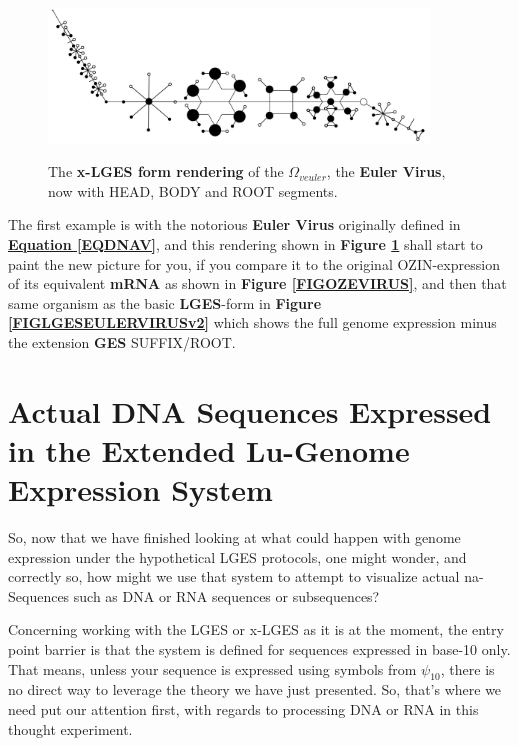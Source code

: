 \documentclass[a4paper, 18pt]{book} %
\begin{document}
\begin{figure}[H]
  \begin{center}
   \includegraphics[trim=0cm 0cm 0cm 0cm, clip, width=0.9\textwidth,]{resources/pdfs/EXT-v2-PLATONIC-EULERVIRUS-landscape.pdf}\\
   \caption{The \textbf{x-LGES form rendering} of the $\Omega_{veuler}$, the \textbf{Euler Virus}, now with HEAD, BODY and ROOT segments.}
  \label{FIGLGESEULERVIRUSv2EXT}
  \end{center}
\end{figure}

The first example is with the notorious \textbf{Euler Virus} originally defined in \textbf{\hyperref[EQDNAV]{Equation \ref{EQDNAV}}}, and this rendering shown in \textbf{Figure \ref{FIGLGESEULERVIRUSv2EXT}} shall start to paint the new picture for you, if you compare it to the original OZIN-expression of its equivalent \textbf{mRNA} as shown in \textbf{Figure \ref{FIGOZEVIRUS}}, and then that same organism as the basic \textbf{LGES}-form in \textbf{Figure \ref{FIGLGESEULERVIRUSv2}} which shows the full genome expression minus the extension \textbf{GES} SUFFIX/ROOT.


\section{Actual DNA Sequences Expressed in the Extended Lu-Genome Expression System}

So, now that we have finished looking at what could happen with genome expression under the hypothetical LGES protocols, one might wonder, and correctly so, how might we use that system to attempt to visualize actual na-Sequences such as DNA or RNA sequences or subsequences?

Concerning working with the LGES or x-LGES as it is at the moment, the entry point barrier is that the system is defined for sequences expressed in base-10 only. That means, unless your sequence is expressed using symbols from $\psi_{10}$, there is no direct way to leverage the theory we have just presented. So, that's where we need put our attention first, with regards to processing DNA or RNA in this thought experiment.
\end{document}
